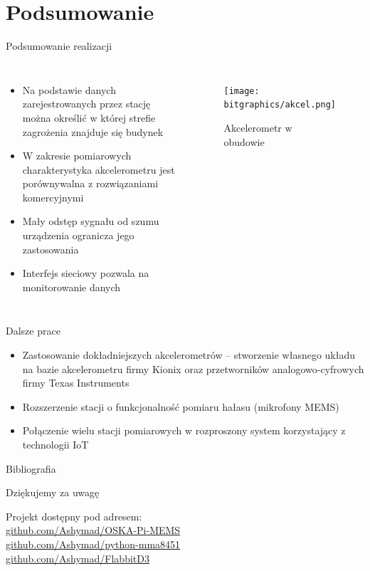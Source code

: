 \documentclass[aspectratio=1610,polish]{beamer} %
\begin{document}
  \section{Podsumowanie}
  \begin{frame}{Podsumowanie realizacji}
    \begin{columns}
      \begin{itemize}
        \item Na podstawie danych zarejestrowanych przez stację można określić w której strefie zagrożenia znajduje się budynek
        \item W zakresie pomiarowych charakterystyka akcelerometru jest porównywalna z rozwiązaniami komercyjnymi
        \item Mały odstęp sygnału od szumu urządzenia ogranicza jego zastosowania
        \item Interfejs sieciowy pozwala na monitorowanie danych
      \end{itemize}
      \begin{figure}
        \texttt{[image: bitgraphics/akcel.png]}
        \caption{Akcelerometr w obudowie}
      \end{figure}
    \end{columns} 
  \end{frame}
  \begin{frame}{Dalsze prace}
    \begin{itemize}
      \item Zastosowanie dokładniejszych akcelerometrów -- stworzenie własnego układu na bazie akcelerometru firmy Kionix oraz przetworników analogowo-cyfrowych firmy Texas Instruments
      \item Rozszerzenie stacji o funkcjonalność pomiaru hałasu (mikrofony MEMS)
      \item Połączenie wielu stacji pomiarowych w rozproszony system korzystający z technologii IoT
    \end{itemize}
  \end{frame}
  \begin{frame}{Bibliografia}
    \nocite{*}
    \printbibliography
  \end{frame}
  \begin{frame}
    \centering
    \vspace*{40pt}

    {\huge Dziękujemy za uwagę}
    \vspace*{20pt}

    Projekt dostępny pod adresem:\\
    \url{github.com/Ashymad/OSKA-Pi-MEMS}\\
    \url{github.com/Ashymad/python-mma8451}\\
    \url{github.com/Ashymad/FlabbitD3}
  \end{frame}
\end{document}
